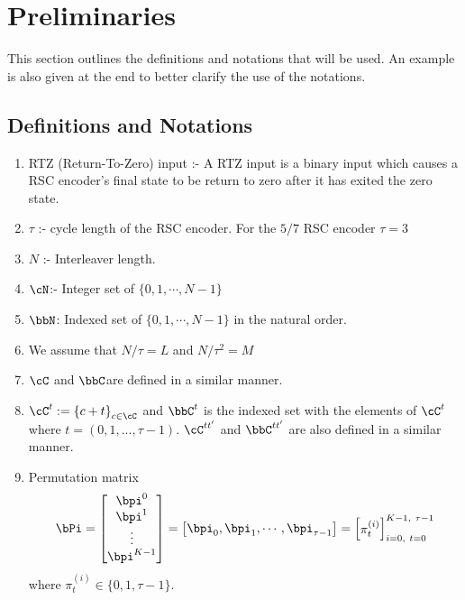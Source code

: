 

\section{Preliminaries}
This section outlines the definitions and notations that will be used. An example is also given at the end to better clarify the use of the notations.
\subsection{Definitions and Notations}
\begin{enumerate}
\item RTZ (Return-To-Zero) input :- A RTZ input is a binary input which causes a RSC encoder's final state to be return to zero after it has exited the zero state.

\item $\tau$ :- cycle length of the RSC encoder. For the $5/7$ RSC encoder $\tau = 3$

\item $N$ :- Interleaver length. 

\item $\cN$:- Integer set of $\{0,1,\cdots,N-1\}$

\item $\bbN$: Indexed set  of $\{0,1,\cdots,N-1\}$ in the natural order.

\item We assume that $N/\tau=L$ and $N/\tau^2 = M$

\item $\cC$ and $\bbC$are defined in a similar manner. 

\item $\cC^{t}:=\left\{c+t\right\}_{c \in \cC}$ and $\bbC^t$ is the indexed set with the elements of $\cC^t$ where  $t=(0,1,...,\tau-1)$. $\cC^{tt'}$ and $\bbC^{tt'}$ are also defined in a similar manner.
\item Permutation matrix 
\begin{equation*}
\bPi = \begin{bmatrix}
\bpi^0\cr
\bpi^1\cr
\vdots\cr
\bpi^{K-1}
\end{bmatrix}
= \begin{bmatrix}
\bpi_0 , \bpi_1,\cdots,\bpi_{\tau-1}
\end{bmatrix}
= \begin{bmatrix}
\pi_{t}^{(i)}
\end{bmatrix}_{i=0,~t=0}^{K-1,~\tau -1}
\end{equation*}
where $\pi_{t}^{(i)} \in \{0,1,\tau-1\}$. 


\end{enumerate}

